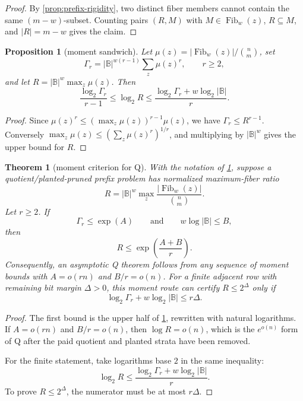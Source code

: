 \documentclass[a4paper,11pt]{amsart}
\newtheorem{theorem}{Theorem}[section]
\newtheorem{proposition}[proposition]{Proposition}
\theoremstyle{remark}
\newcommand{\B}{\mathbb B}
\newcommand{\Fib}{\operatorname{Fib}}
\begin{document}
\begin{proof}
By \cref{prop:prefix-rigidity}, two distinct fiber members cannot contain the same \((m-w)\)-subset.  Counting pairs \((R,M)\) with \(M\in\Fib_w(z)\), \(R\subseteq M\), and \(|R|=m-w\) gives the claim.
\end{proof}

\begin{proposition}[moment sandwich]\label{prop:moment-sandwich}
Let \(\mu(z)=|\Fib_w(z)|/\binom{n}{m}\), set
\[
        \Gamma_r=|\B|^{w(r-1)}\sum_z\mu(z)^r,\qquad r\ge2,
\]
and let \(R=|\B|^w\max_z\mu(z)\).  Then
\[
        \frac{\log_2\Gamma_r}{r-1}\le \log_2 R
        \le \frac{\log_2\Gamma_r+w\log_2|\B|}{r}.
\]
\end{proposition}

\begin{proof}
Since \(\mu(z)^r\le(\max_z\mu(z))^{r-1}\mu(z)\), we have \(\Gamma_r\le R^{r-1}\).  Conversely \(\max_z\mu(z)\le(\sum_z\mu(z)^r)^{1/r}\), and multiplying by \(|\B|^w\) gives the upper bound for \(R\).
\end{proof}

\begin{theorem}[moment criterion for Q]\label{thm:moment-q}
With the notation of \cref{prop:moment-sandwich}, suppose a quotient/planted-pruned prefix problem has normalized maximum-fiber ratio
\[
        R=|\B|^w\max_z\frac{|\Fib_w(z)|}{\binom nm}.
\]
Let \(r\ge2\).  If
\[
        \Gamma_r\le \exp(A)
        \qquad\text{and}\qquad
        w\log|\B|\le B,
\]
then
\[
        R\le \exp\!\left(\frac{A+B}{r}\right).
\]
Consequently, an asymptotic Q theorem follows from any sequence of moment bounds with \(A=o(rn)\) and \(B/r=o(n)\).  For a finite adjacent row with remaining bit margin \(\Delta>0\), this moment route can certify \(R\le2^\Delta\) only if
\[
        \log_2\Gamma_r+w\log_2|\B|\le r\Delta .
\]
\end{theorem}

\begin{proof}
The first bound is the upper half of \cref{prop:moment-sandwich}, rewritten with natural logarithms.  If \(A=o(rn)\) and \(B/r=o(n)\), then \(\log R=o(n)\), which is the \(e^{o(n)}\) form of Q after the paid quotient and planted strata have been removed.

For the finite statement, take logarithms base \(2\) in the same inequality:
\[
        \log_2R\le\frac{\log_2\Gamma_r+w\log_2|\B|}{r}.
\]
To prove \(R\le2^\Delta\), the numerator must be at most \(r\Delta\).
\end{proof}
\end{document}
